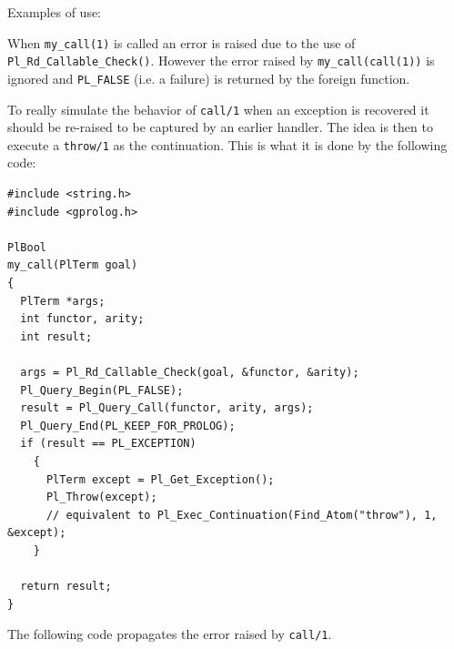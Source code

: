 
Examples of use:

\begin{CodeTwoCols}
\SkipLine
{}
\SkipLine
{}
\SkipLine
{}
\SkipLine
{}
\SkipLine
{}
\SkipLine
{}
\SkipLine
{}
\end{CodeTwoCols}

When \texttt{my\_call(1)} is called an error is raised due to the use of
\texttt{Pl\_Rd\_Callable\_Check()}. However the error raised by
\texttt{my\_call(call(1))} is ignored and \texttt{PL\_FALSE} (i.e. a failure) is
returned by the foreign function.

To really simulate the behavior of \texttt{call/1} when an exception
is recovered it should be re-raised to be captured by an earlier
handler. The idea is then to execute a \texttt{throw/1} as the
continuation. This is what it is done by the following code:

\begin{Code}
\begin{verbatim}
#include <string.h>
#include <gprolog.h>

PlBool
my_call(PlTerm goal)
{
  PlTerm *args;
  int functor, arity;
  int result;

  args = Pl_Rd_Callable_Check(goal, &functor, &arity);
  Pl_Query_Begin(PL_FALSE);
  result = Pl_Query_Call(functor, arity, args);
  Pl_Query_End(PL_KEEP_FOR_PROLOG);
  if (result == PL_EXCEPTION)
    {
      PlTerm except = Pl_Get_Exception();
      Pl_Throw(except); 
      // equivalent to Pl_Exec_Continuation(Find_Atom("throw"), 1, &except);
    }

  return result;
}
\end{verbatim}
\end{Code}

The following code propagates the error raised by \texttt{call/1}.

\begin{CodeTwoCols}
\end{CodeTwoCols}

